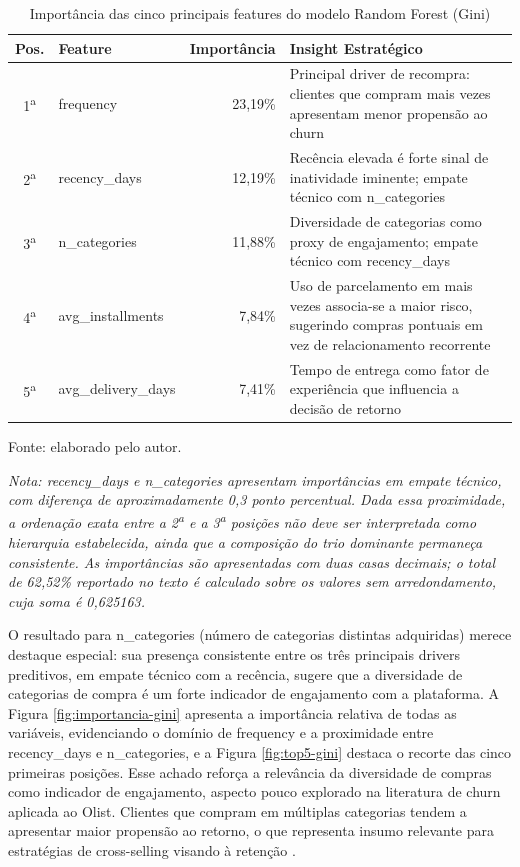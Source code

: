 \begin{table}[htbp]
\ABNTEXfontereduzida
\SingleSpacing
\caption{Importância das cinco principais features do modelo Random Forest (Gini)}
\label{tab:importancia-gini}
\centering
\begin{tabular}{@{}cl r >{\raggedright\arraybackslash}p{7.6cm}@{}}
\hline
\textbf{Pos.} & \textbf{Feature} & \textbf{Importância} & \textbf{Insight Estratégico} \\
\hline
1\textsuperscript{a} & frequency & 23,19\% & Principal driver de recompra: clientes que compram mais vezes apresentam menor propensão ao churn \\
2\textsuperscript{a} & recency\_days & 12,19\% & Recência elevada é forte sinal de inatividade iminente; empate técnico com n\_categories \\
3\textsuperscript{a} & n\_categories & 11,88\% & Diversidade de categorias como proxy de engajamento; empate técnico com recency\_days \\
4\textsuperscript{a} & avg\_installments & 7,84\% & Uso de parcelamento em mais vezes associa-se a maior risco, sugerindo compras pontuais em vez de relacionamento recorrente \\
5\textsuperscript{a} & avg\_delivery\_days & 7,41\% & Tempo de entrega como fator de experiência que influencia a decisão de retorno \\
\hline
\end{tabular}
\begin{flushleft}
	\ABNTEXfontereduzida
	\SingleSpacing
	Fonte: elaborado pelo autor.

	\textit{Nota: recency\_days e n\_categories apresentam importâncias em empate técnico, com diferença de aproximadamente 0,3 ponto percentual. Dada essa proximidade, a ordenação exata entre a 2\textsuperscript{a} e a 3\textsuperscript{a} posições não deve ser interpretada como hierarquia estabelecida, ainda que a composição do trio dominante permaneça consistente. As importâncias são apresentadas com duas casas decimais; o total de 62,52\% reportado no texto é calculado sobre os valores sem arredondamento, cuja soma é 0,625163.}
\end{flushleft}
\end{table}

O resultado para n\_categories (número de categorias distintas adquiridas) merece destaque especial: sua presença consistente entre os três principais drivers preditivos, em empate técnico com a recência, sugere que a diversidade de categorias de compra é um forte indicador de engajamento com a plataforma. A Figura \ref{fig:importancia-gini} apresenta a importância relativa de todas as variáveis, evidenciando o domínio de frequency e a proximidade entre recency\_days e n\_categories, e a Figura \ref{fig:top5-gini} destaca o recorte das cinco primeiras posições. Esse achado reforça a relevância da diversidade de compras como indicador de engajamento, aspecto pouco explorado na literatura de churn aplicada ao Olist. Clientes que compram em múltiplas categorias tendem a apresentar maior propensão ao retorno, o que representa insumo relevante para estratégias de cross-selling visando à retenção \cite{kotler2016}.

